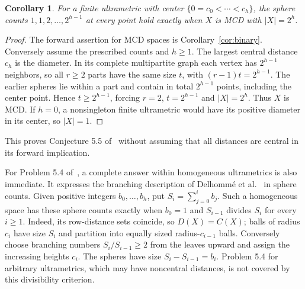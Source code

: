 \documentclass[11pt]{article}
\newtheorem{corollary}[theorem]{Corollary}
\begin{document}
\begin{corollary}\label{cor:spheres}
For a finite ultrametric with center $\{0=c_0<\cdots<c_h\}$,
the sphere counts $1,1,2,\ldots,2^{h-1}$ at every point hold
exactly when $X$ is MCD with $|X|=2^h$.
\end{corollary}
\begin{proof}
The forward assertion for MCD spaces is Corollary~\ref{cor:binary}.
Conversely assume the prescribed counts and $h\ge1$. The largest
central distance $c_h$ is the diameter. In its complete multipartite
graph each vertex has $2^{h-1}$ neighbors, so all $r\ge2$ parts
have the same size $t$, with $(r-1)t=2^{h-1}$. The earlier spheres
lie within a part and contain in total $2^{h-1}$ points, including
the center point. Hence $t\ge2^{h-1}$, forcing $r=2$, $t=2^{h-1}$
and $|X|=2^h$. Thus $X$ is MCD. If $h=0$, a nonsingleton finite
ultrametric would have its positive diameter in its center, so $|X|=1$.
\end{proof}
This proves Conjecture 5.5 of~\cite[p.~27]{BT} without assuming that
all distances are central in its forward implication.

For Problem 5.4 of~\cite[p.~27]{BT}, a complete answer within
homogeneous ultrametrics is also immediate. It expresses the branching
description of Delhomm\'e et al.~\cite[Section 3.1, Lemma 1;
Section 3.2, Proposition 1(3)]{D} in sphere counts. Given positive integers
$b_0,\ldots,b_h$, put $S_i=\sum_{j=0}^i b_j$.
Such a homogeneous space has these sphere counts exactly when
$b_0=1$ and $S_{i-1}$ divides $S_i$ for every $i\ge1$.
Indeed, its row-distance sets coincide, so $D(X)=C(X)$; balls of
radius $c_i$ have size $S_i$ and partition into equally sized
radius-$c_{i-1}$ balls. Conversely choose branching numbers
$S_i/S_{i-1}\ge2$ from the leaves upward and assign the increasing
heights $c_i$. The spheres have size $S_i-S_{i-1}=b_i$.
Problem 5.4 for arbitrary ultrametrics, which may have noncentral
distances, is not covered by this divisibility criterion.
\end{document}
